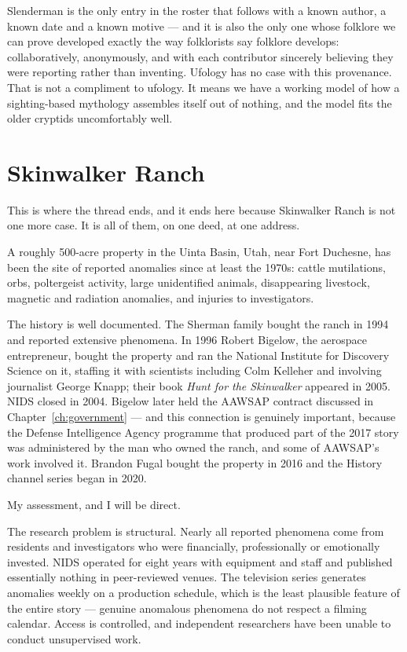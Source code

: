 \begin{funfact}
Slenderman is the only entry in the roster that follows with a known author, a known date and a
known motive --- and it is also the only one whose folklore we can prove developed exactly the way
folklorists say folklore develops: collaboratively, anonymously, and with each contributor
sincerely believing they were reporting rather than inventing. Ufology has no case with this
provenance. That is not a compliment to ufology. It means we have a working model of how a
sighting-based mythology assembles itself out of nothing, and the model fits the older cryptids
uncomfortably well.
\end{funfact}



\section{Skinwalker Ranch}\label{sec:skinwalker}

This is where the thread ends, and it ends here because Skinwalker Ranch is not one more case.
It is all of them, on one deed, at one address.

A roughly 500-acre property in the Uinta Basin, Utah, near Fort Duchesne, has been the site of
reported anomalies since at least the 1970s: cattle mutilations, orbs, poltergeist activity,
large unidentified animals, disappearing livestock, magnetic and radiation anomalies, and injuries
to investigators.

The history is well documented. The Sherman family bought the ranch in 1994 and reported
extensive phenomena. In 1996 Robert Bigelow, the aerospace entrepreneur, bought the property and
ran the National Institute for Discovery Science on it, staffing it with scientists including
Colm Kelleher and involving journalist George Knapp; their book \emph{Hunt for the Skinwalker}
appeared in 2005. NIDS closed in 2004. Bigelow later held the AAWSAP contract discussed in
Chapter~\ref{ch:government} --- and this connection is genuinely important, because the Defense Intelligence Agency
programme that produced part of the 2017 story was administered by the man who owned the ranch,
and some of AAWSAP's work involved it. Brandon Fugal bought the property in 2016 and the History
channel series began in 2020.

My assessment, and I will be direct.

The research problem is structural. Nearly all reported phenomena come from residents and
investigators who were financially, professionally or emotionally invested. NIDS operated for
eight years with equipment and staff and published essentially nothing in peer-reviewed venues.
The television series generates anomalies weekly on a production schedule, which is the least
plausible feature of the entire story --- genuine anomalous phenomena do not respect a filming
calendar. Access is controlled, and independent researchers have been unable to conduct
unsupervised work.

